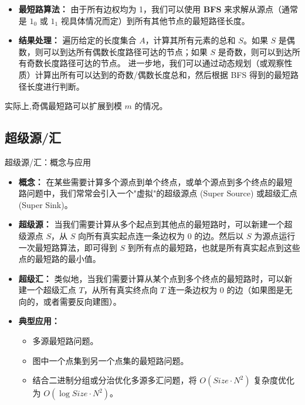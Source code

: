\documentclass[11pt]{beamer}
\begin{document}
\begin{frame}
    \begin{itemize}
        \item \textbf{最短路算法：}
        由于所有边权均为 1，我们可以使用 \textbf{BFS} 来求解从源点（通常是 $1_0$ 或 $1_1$ 视具体情况而定）到所有其他节点的最短路径长度。
        \item \textbf{结果处理：}
        遍历给定的长度集合 $A$，计算其所有元素的总和 $S$。如果 $S$ 是偶数，则可以到达所有偶数长度路径可达的节点；如果 $S$ 是奇数，则可以到达所有奇数长度路径可达的节点。
        进一步地，我们可以通过动态规划（或观察性质）计算出所有可以达到的奇数/偶数长度总和，然后根据 BFS 得到的最短路径长度进行判断。
    \end{itemize}
    实际上,奇偶最短路可以扩展到模 $m$ 的情况。
\end{frame}

\subsection{超级源/汇}
\begin{frame}
    超级源/汇：概念与应用
    \begin{itemize}
        \item \textbf{概念：} 在某些需要计算多个源点到单个终点，或单个源点到多个终点的最短路问题中，我们常常会引入一个"虚拟"的超级源点 (Super Source) 或超级汇点 (Super Sink)。
        \item \textbf{超级源：} 当我们需要计算从多个起点到其他点的最短路时，可以新建一个超级源点 $S$，从 $S$ 向所有真实起点连一条边权为 0 的边。然后以 $S$ 为源点运行一次最短路算法，即可得到 $S$ 到所有点的最短路，也就是所有真实起点到这些点的最短路的最小值。
        \item \textbf{超级汇：} 类似地，当我们需要计算从某个点到多个终点的最短路时，可以新建一个超级汇点 $T$，从所有真实终点向 $T$ 连一条边权为 0 的边（如果图是无向的，或者需要反向建图）。
        \item \textbf{典型应用：}
        \begin{itemize}
            \item 多源最短路问题。
            \item 图中一个点集到另一个点集的最短路问题。
            \item 结合二进制分组或分治优化多源多汇问题，将 $O(Size \cdot N^2)$ 复杂度优化为 $O(\log Size \cdot N^2)$。
        \end{itemize}
    \end{itemize}
\end{frame}
\end{document}
